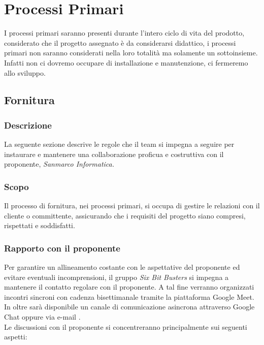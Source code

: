 \section{Processi Primari}
I processi primari saranno presenti durante l'intero ciclo di vita del prodotto, 
considerato che il progetto assegnato è da considerarsi didattico, i processi 
primari non saranno considerati nella loro totalità ma solamente un sottoinsieme.\\
Infatti non ci dovremo occupare di installazione e manutenzione, ci fermeremo allo sviluppo.

    \subsection{Fornitura}
        \subsubsection{Descrizione}
        La seguente sezione descrive le regole che il team si impegna a seguire 
        per instaurare e mantenere una collaborazione proficua e costruttiva con il proponente, 
        \textit{Sanmarco Informatica.}

        \subsubsection{Scopo}
        Il processo di fornitura, nei processi primari, si occupa di gestire le relazioni 
        con il cliente o committente, assicurando che i requisiti del progetto siano 
        compresi, rispettati e soddisfatti.

        \subsubsection{Rapporto con il proponente}
        Per garantire un allineamento costante con le aspettative del proponente ed evitare eventuali incomprensioni,
        il gruppo \textit{Six Bit Busters} si impegna a mantenere il contatto regolare con il proponente.
        A tal fine verranno organizzati incontri sincroni con cadenza bisettimanale tramite la piattaforma Google Meet. 
        In oltre sarà disponibile un canale di comunicazione asincrona attraverso Google Chat oppure via e-mail .\\


        Le discussioni con il proponente si concentreranno principalmente sui seguenti aspetti:

